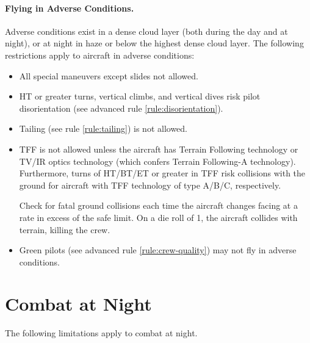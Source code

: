 \begin{advancedrules}
{\paragraph{Flying in Adverse Conditions.}

Adverse conditions exist in a dense cloud layer (both during the day and at night), or at night in haze or below the highest dense cloud layer. The following restrictions apply to aircraft in adverse conditions:

\begin{itemize}

    \item{} All special maneuvers except slides not allowed.

    \item{} HT or greater turns, vertical climbs, and vertical dives risk pilot disorientation (see advanced rule \ref{rule:disorientation}).

    \item{} Tailing (see rule \ref{rule:tailing}) is not allowed.

    \item{} TFF is not allowed unless the aircraft has Terrain Following technology or TV/IR optics technology (which confers Terrain Following-A technology). Furthermore, turns of HT/BT/ET or greater in TFF risk collisions with the ground for aircraft with TFF technology of type A/B/C, respectively.
    
    Check for fatal ground collisions each time the aircraft changes facing at a rate in excess of the safe limit. On a die roll of 1, the aircraft collides with terrain, killing the crew.

    \item{} Green pilots (see advanced rule \ref{rule:crew-quality}) may not fly in adverse conditions.

\end{itemize}

\section{Combat at Night}
\label{rule:combat-at-night}

The following limitations apply to combat at night.

}
\end{advancedrules}
